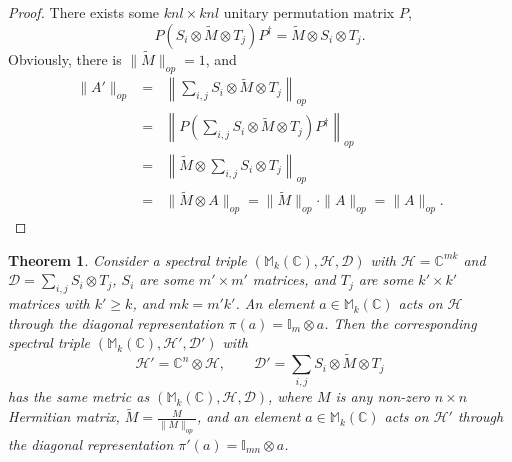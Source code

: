 \documentclass[a4paper,12pt]{article}
\newtheorem{theorem}{Theorem}
\begin{document}
\begin{proof}
	There exists some $knl \times knl$ unitary permutation
matrix $P$,
\begin{equation}
  P (S_i \otimes \tilde{M} \otimes T_j) P^{\dag} = \tilde{M} \otimes S_i
  \otimes T_j .
\end{equation}
Obviously, there is $\| \tilde{M} \|_{op} = 1$, and
\begin{eqnarray}
  \|A' \|_{op} & = & \left\| \sum_{i, j} S_i \otimes \tilde{M} \otimes T_j
  \right\|_{op} \nonumber\\
  & = & \left\| P \left( \sum_{i, j} S_i \otimes \tilde{M} \otimes T_j
  \right) P^{\dag} \right\|_{op} \nonumber\\
  & = & \left\| \tilde{M} \otimes \sum_{i, j} S_i \otimes T_j \right\|_{op}
  \nonumber\\
  & = & \| \tilde{M} \otimes A\|_{op} = \| \tilde{M} \|_{op} \cdot \|A\|_{op}
  = \|A\|_{op} . 
\end{eqnarray}
\end{proof}

\begin{theorem}
  Consider a spectral triple $(\mathbb{M}_k (\mathbb{C}), \mathcal{H},
  \mathcal{D})$ with $\mathcal{H}=\mathbb{C}^{m k}$ and $\mathcal{D}= \sum_{i,
  j} S_i \otimes T_j$, $S_i$ are some $m' \times m'$ matrices, and $T_j$ are
  some $k' \times k'$ matrices with $k' \geqslant k$, and $mk = m' k'$. An
  element $a \in \mathbb{M}_k (\mathbb{C})$ acts on $\mathcal{H}$ through the
  diagonal representation $\pi (a) =\mathbb{I}_m \otimes a$. Then the
  corresponding spectral triple $(\mathbb{M}_k (\mathbb{C}), \mathcal{H}',
  \mathcal{D}')$ with
  \begin{equation}
    \mathcal{H}' =\mathbb{C}^n \otimes \mathcal{H}, \qquad \mathcal{D}' =
    \sum_{i, j} S_i \otimes \tilde{M} \otimes T_j
  \end{equation}
  has the same metric as $(\mathbb{M}_k (\mathbb{C}), \mathcal{H},
  \mathcal{D})$, where $M$ is any non-zero $n \times n$ Hermitian matrix,
  $\tilde{M} = \frac{M}{\|M\|_{op}}$, and an element $a \in \mathbb{M}_k
  (\mathbb{C})$ acts on $\mathcal{H}'$ through the diagonal representation
  $\pi' (a) =\mathbb{I}_{m n} \otimes a$.
\end{theorem}
\end{document}
